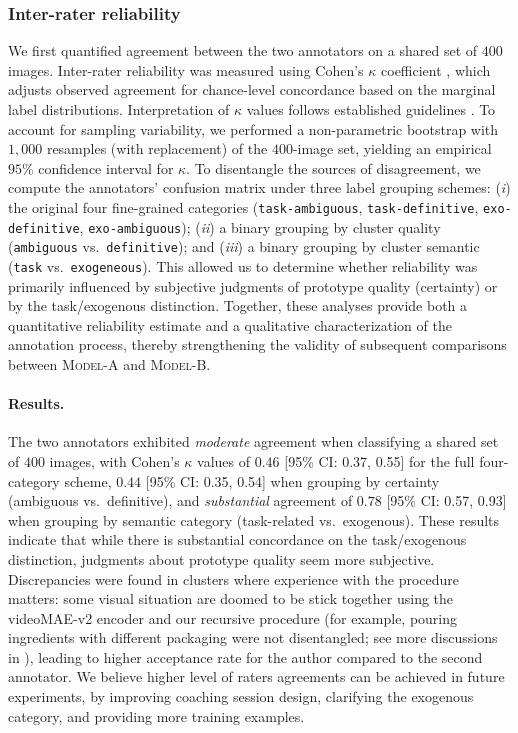         \subsubsection{Inter-rater reliability} 

            We first quantified agreement between the two annotators on a shared set of $400$ images. Inter-rater reliability was measured using Cohen’s $\kappa$ coefficient \citep{cohen1960}, which adjusts observed agreement for chance-level concordance based on the marginal label distributions. Interpretation of $\kappa$ values follows established guidelines \cite{McHugh2012-bu, Landis1977}. To account for sampling variability, we performed a non-parametric bootstrap with $1{,}000$ resamples (with replacement) of the $400$-image set, yielding an empirical $95\%$ confidence interval for $\kappa$. To disentangle the sources of disagreement, we compute the annotators’ confusion matrix under three label grouping schemes: (\emph{i}) the original four fine-grained categories (\texttt{task-ambiguous}, \texttt{task-definitive}, \texttt{exo-definitive}, \texttt{exo-ambiguous}); (\emph{ii}) a binary grouping by cluster quality (\texttt{ambiguous} vs.~\texttt{definitive}); and (\emph{iii}) a binary grouping by cluster semantic (\texttt{task} vs.~\texttt{exogeneous}). This allowed us to determine whether reliability was primarily influenced by subjective judgments of prototype quality (certainty) or by the task/exogenous distinction.
            Together, these analyses provide both a quantitative reliability estimate and a qualitative characterization of the annotation process, thereby strengthening the validity of subsequent comparisons between \textsc{Model-A} and \textsc{Model-B}.

            \paragraph{Results.\\}

                The two annotators exhibited \textit{moderate} agreement when classifying a shared set of $400$ images, with Cohen's $\kappa$ values of $0.46$ [95\% CI: 0.37, 0.55] for the full four-category scheme, $0.44$ [95\% CI: 0.35, 0.54] when grouping by certainty (ambiguous vs.~definitive), and \textit{substantial} agreement of $0.78$ [95\% CI: 0.57, 0.93] when grouping by semantic category (task-related vs.~exogenous). These results indicate that while there is substantial concordance on the task/exogenous distinction, judgments about prototype quality seem more subjective. Discrepancies were found in clusters where experience with the procedure matters: some visual situation are doomed to be stick together using the videoMAE-v2 encoder and our recursive procedure (for example, pouring ingredients with different packaging were not disentangled; see more discussions in ), leading to higher acceptance rate for the author compared to the second annotator. We believe higher level of raters agreements can be achieved in future experiments, by improving coaching session design, clarifying the exogenous category, and providing more training examples.

